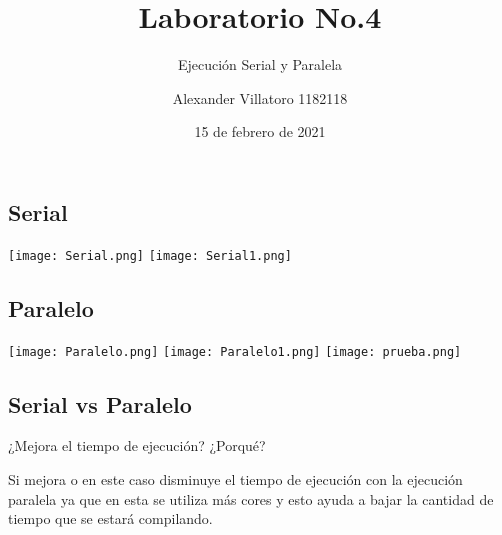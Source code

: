 \documentclass[]{scrreprt}
\begin{document}
\title{Laboratorio No.4}
\subtitle{Ejecución Serial y Paralela}
\author{Alexander Villatoro 1182118}
\date {15 de febrero de 2021}

\maketitle

\subsection{Serial}
\texttt{[image: Serial.png]}
\texttt{[image: Serial1.png]}
\subsection{Paralelo}
\texttt{[image: Paralelo.png]}
\texttt{[image: Paralelo1.png]}
\texttt{[image: prueba.png]}
\subsection{Serial vs Paralelo}
¿Mejora el tiempo de ejecución? ¿Porqué?

Si mejora o en este caso disminuye el tiempo de ejecución con la ejecución paralela ya que en esta se utiliza más cores y esto ayuda a bajar la cantidad de tiempo que se estará compilando.
\end{document}
